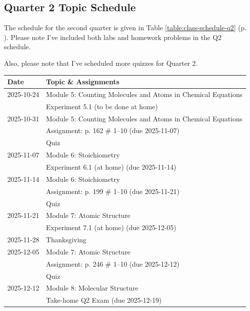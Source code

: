 \documentclass[11pt, oneside]{article}   	%
\begin{document}
\subsection*{Quarter 2 Topic Schedule}
The schedule for the second quarter is given in Table \ref{table:class-schedule-q2} (p. \pageref{table:class-schedule-q2}).
Please note I've included both labs and homework problems in the Q2 schedule.

Also, please note that I've scheduled more quizzes for Quarter 2.


\begin{table}[h]
\centering
\begin{tabular}{ l | l }
Date & Topic \& Assignments \\
\hline
2025-10-24 & Module 5:  Counting Molecules and Atoms in Chemical Equations \\
                   & Experiment 5.1 (to be done at home) \\

\hline
2025-10-31 & Module 5:  Counting Molecules and Atoms in Chemical Equations \\
                   & Assignment: p. 162 \# 1--10 (due 2025-11-07) \\
                   & Quiz \\
                   
\hline
2025-11-07 & Module 6: Stoichiometry \\
                   & Experiment 6.1 (at home) (due 2025-11-14) \\

\hline
2025-11-14 & Module 6: Stoichiometry \\
                   & Assignment: p. 199 \# 1--10 (due 2025-11-21) \\
                   & Quiz \\

\hline
2025-11-21 & Module 7: Atomic Structure \\
                   & Experiment 7.1 (at home) (due 2025-12-05)\\

\hline
2025-11-28 & Thanksgiving \\

\hline
2025-12-05 & Module 7: Atomic Structure \\
                   & Assignment: p. 246 \# 1--10 (due 2025-12-12)\\
                   & Quiz \\

\hline
2025-12-12 & Module 8: Molecular Structure \\
                   & Take-home Q2 Exam (due 2025-12-19)\\


\end{tabular}
\end{table}
\end{document}

